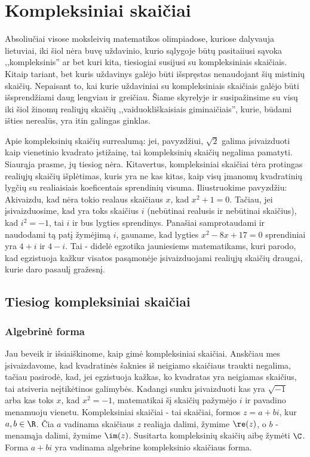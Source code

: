 \section{Kompleksiniai skaičiai}

Absoliučiai visose moksleivių matematikos olimpiadose, kuriose dalyvauja lietuviai, iki šiol nėra buvę uždavinio, kurio sąlygoje būtų pasitaiiusi sąvoka ,,kompleksinis'' ar bet kuri kita, tiesiogiai susijusi su kompleksiniais skaičiais. Kitaip tariant, bet kuris uždavinys galėjo būti išspręstas nenaudojant šių mistinių skaičių. Nepaisant to, kai kurie uždaviniai su kompleksiniais skaičiais galėjo būti išsprendžiami daug lengviau ir greičiau. Šiame skyrelyje ir susipažinsime su visų iki šiol žinomų realiųjų skaičių ,,vaiduokliškaisiais giminaičiais'', kurie, būdami išties nerealūs, yra itin galingas ginklas.  

Apie kompleksinių skaičių surrealumą: jei, pavyzdžiui, $\sqrt{2}$ galima įsivaizduoti kaip vienetinio kvadrato įstižainę, tai kompleksinių skaičių negalima pamatyti. Siaurąja prasme, jų tiesiog nėra. Kitavertus, kompleksiniai skaičiai tėra protingas realiųjų skaičių išplėtimas, kuris yra ne kas kitas, kaip visų įmanomų kvadratinių lygčių su realiaisiais koeficentais sprendinių visuma. Iliustruokime pavyzdžiu: Akivaizdu, kad nėra tokio realaus skaičiaus $x$, kad $x^2+1=0$. Tačiau, jei įsivaizduosime, kad yra toks skaičius $i$ (nebūtinai realusis ir nebūtinai skaičius), kad $i^2=-1$, tai $i$ ir bus lygties sprendinys. Panašiai samprotaudami ir naudodami tą patį žymėjimą $i$, gauname, kad lygties $x^2-8x+17=0$ sprendiniai yra $4+i$ ir $4-i$. Tai - didelė egzotika jauniesiems matematikams, kuri parodo, kad egzistuoja kažkur visatos pasąmonėje įsivaizduojami realiųjų skaičių draugai, kurie daro pasaulį gražesnį.

\subsection{Tiesiog kompleksiniai skaičiai}

\subsubsection{Algebrinė forma}

Jau beveik ir išsiaiškinome, kaip gimė kompleksiniai skaičiai. Anskčiau mes įsivaizdavome, kad kvadratinės šaknies iš neigiamo skaičiaus traukti negalima, tačiau pasirodė, kad, jei egzistuoja kažkas, ko kvadratas yra neigiamas skaičius, tai atsiveria neįtikėtinos galimybės. Kadangi sunku įsivaizduoti kas yra $\sqrt{-1}$ arba kas toks $x$, kad $x^2=-1$, matematikai šį skaičių pažymėjo $i$ ir pavadino menamuoju vienetu. Kompleksiniai skaičiai - tai skaičiai, formos $z=a+bi$, kur $a,b\in\R$. Čia $a$ vadinama skaičiaus $z$ realiąja dalimi, žymime $\re(z)$, o $b$ - menamąja dalimi, žymime $\im(z)$. Susitarta kompleksinių skaičių aibę žymėti $\C$. Forma $a+bi$ yra vadinama algebrine kompleksinio skaičiaus forma. 

